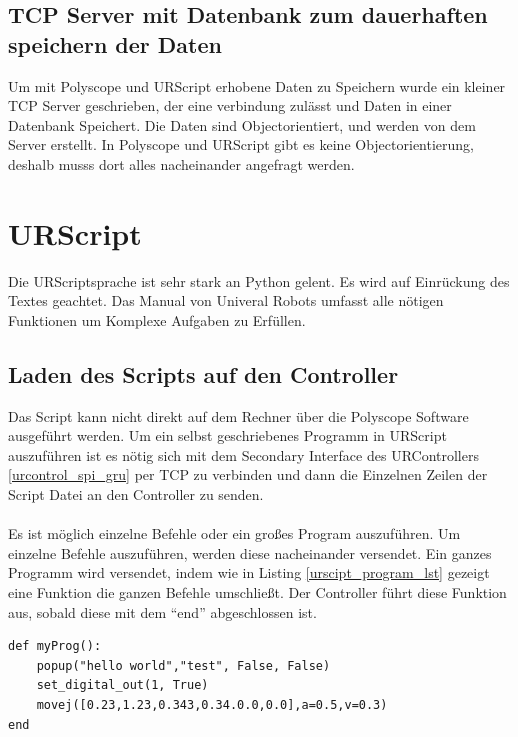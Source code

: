 \subsection{TCP Server mit Datenbank zum dauerhaften speichern der Daten}
\label{tcp_datentank_sicherung_rel}

Um mit Polyscope und URScript erhobene Daten zu Speichern wurde ein kleiner TCP Server geschrieben, der eine verbindung zulässt und Daten in einer Datenbank Speichert. Die Daten sind Objectorientiert, und werden von dem Server erstellt. 
In Polyscope und URScript gibt es keine Objectorientierung, deshalb musss dort alles nacheinander angefragt werden. 


\section{URScript}
\label{sec:ur_script_rel}

Die URScriptsprache ist sehr stark an Python gelent. Es wird auf Einrückung des Textes geachtet.
Das Manual von Univeral Robots umfasst alle nötigen Funktionen um Komplexe Aufgaben zu Erfüllen.

\subsection{Laden des Scripts auf den Controller}
\label{load_script_rel}

Das Script kann nicht direkt auf dem Rechner über die Polyscope Software ausgeführt werden. Um ein selbst geschriebenes Programm in URScript auszuführen ist es nötig sich mit dem Secondary Interface des URControllers \ref{urcontrol_spi_gru} per TCP zu verbinden und dann die Einzelnen Zeilen der Script Datei an den Controller zu senden.
\\\\
Es ist möglich einzelne Befehle oder ein großes Program auszuführen. Um einzelne Befehle auszuführen, werden diese nacheinander versendet.
Ein ganzes Programm wird versendet, indem wie in Listing \ref{urscipt_program_lst} gezeigt eine Funktion die ganzen Befehle umschließt. Der Controller führt diese Funktion aus, sobald diese mit dem ``end'' abgeschlossen ist.

\begin{lstlisting}[caption={Kleines Beispielprogram in URScript}, label=lst:urscipt_program_lst ,captionpos=b] 
def myProg():
	popup("hello world","test", False, False)
	set_digital_out(1, True)
	movej([0.23,1.23,0.343,0.34.0.0,0.0],a=0.5,v=0.3)
end
\end{lstlisting}


